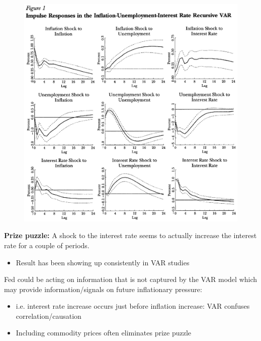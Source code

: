 \documentclass{beamer}
\begin{document}
\begin{frame}
\begin{figure}
  \end{figure}
\end{frame}

\begin{frame}
  \begin{figure}
    \includegraphics[scale=.5]{stock_watson2.eps}
  \end{figure}
\end{frame}

\begin{frame}
  \textbf{Prize puzzle:} A shock to the interest rate seems to actually increase the interest rate for a couple of periods.
  \begin{itemize}
    \item Result has been showing up consistently in VAR studies
  \end{itemize}
  \medskip
  Fed could be acting on information that is not captured by the VAR model which may provide information/signals on future inflationary pressure:
  \begin{itemize}
    \item i.e. interest rate increase occurs just before inflation increase: VAR confuses correlation/causation
    \item Including commodity prices often eliminates prize puzzle
  \end{itemize}
\end{frame}
\end{document}
